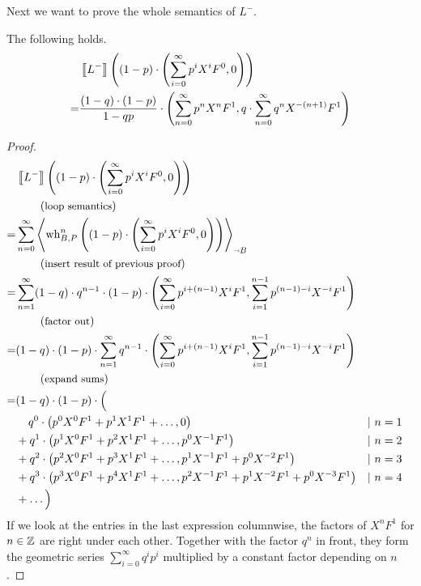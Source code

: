Next we want to prove the whole semantics of $L^-$.
\begin{lemma}
	The following holds.
	\begin{align*}
		 & \left\llbracket L^- \right\rrbracket\left( (1-p) \cdot \left( \sum_{i = 0}^{\infty} p^i X^i F^0, 0 \right) \right) \\
		=& \frac{(1-q) \cdot (1-p)}{1-qp} \cdot \left( 
			\sum_{n=0}^{\infty} p^n X^n F^1,
			q \cdot \sum_{n=0}^{\infty} q^n X^{-(n+1)} F^1  \right)
	\end{align*}
	\begin{proof}
	\begin{align*}
		 & \left\llbracket L^- \right\rrbracket\left( (1-p) \cdot \left( \sum_{i=0}^{\infty} p^i X^i F^0, 0 \right) \right) \\
		 & \hspace*{2em} \left(\text{\small loop semantics}\right) \\
		=& \sum_{n=0}^{\infty} \left\langle 
			\operatorname{wh}_{B, P}^n\left( (1-p) \cdot \left( \sum_{i=0}^{\infty} p^i X^i F^0, 0 \right) \right)  \right\rangle_{\lnot B} \\
		 & \hspace*{2em} \left(\text{\small insert result of previous proof}\right) \\
		=& \sum_{n=1}^{\infty} (1-q) \cdot q^{n-1} \cdot (1-p) \cdot \left( 
			\sum_{i=0}^{\infty} p^{i+(n-1)} X^i F^1,
			\sum_{i=1}^{n-1} p^{(n-1)-i} X^{-i} F^1 \right) \\
		 & \hspace*{2em} \left(\text{\small factor out}\right) \\
		=& (1-q) \cdot (1-p) \cdot \sum_{n=1}^{\infty} q^{n-1} \cdot \left( 
			\sum_{i=0}^{\infty} p^{i+(n-1)} X^i F^1,
			\sum_{i=1}^{n-1} p^{(n-1)-i} X^{-i} F^1 \right) \\
		 & \hspace*{2em} \left(\text{\small expand sums}\right) \\
		=& (1-q) \cdot (1-p) \cdot \Big( \\
		& \phantom{\ +} q^0 \cdot \left(  p^0 X^0 F^1 + p^1 X^1 F^1 + \ldots,
			0  \right) && |\ n = 1 \\
		& + q^1 \cdot \left(  p^1 X^0 F^1 + p^2 X^1 F^1 + \ldots,
			p^0 X^{-1} F^1  \right) && |\ n = 2 \\
		& + q^2 \cdot \left(  p^2 X^0 F^1 + p^3 X^1 F^1 + \ldots,
			p^1 X^{-1} F^1 + p^0 X^{-2} F^1  \right) && |\ n = 3 \\
		& + q^3 \cdot \left(  p^3 X^0 F^1 + p^4 X^1 F^1 + \ldots,
			 p^2 X^{-1} F^1 + p^1 X^{-2} F^1 + p^0 X^{-3} F^1   \right) && |\ n = 4 \\
		& + \ldots \Big)
	\end{align*}
	If we look at the entries in the last expression columnwise, the factors of $X^n F^1$ for $n \in \mathbb{Z}$ are right under each other.
	Together with the factor $q^n$ in front, they form the geometric series $\sum_{i=0}^{\infty} q^i p^i$ multiplied by a constant factor depending on $n$.

\end{proof}
\end{lemma}
